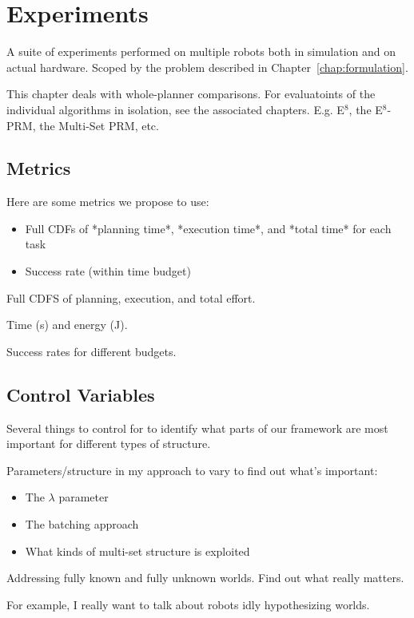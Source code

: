 \chapter{Experiments}
\label{chap:experiments}

A suite of experiments performed on multiple robots
both in simulation and on actual hardware.
Scoped by the problem described in Chapter~\ref{chap:formulation}.

This chapter deals with whole-planner comparisons.
For evaluatoints of the individual algorithms in isolation,
see the associated chapters.
E.g. E$^8$, the E$^8$-PRM, the Multi-Set PRM, etc.

\section{Metrics}

Here are some metrics we propose to use:
\begin{itemize}
\item Full CDFs of *planning time*, *execution time*,
   and *total time* for each task
\item Success rate (within time budget)
\end{itemize}

Full CDFS of planning, execution, and total effort.

Time (s) and energy (J).

Success rates for different budgets.

\section{Control Variables}

Several things to control for to identify what parts of our framework
are most important for different types of structure.

Parameters/structure in my approach to vary to find out
what's important:
\begin{itemize}
\item The $\lambda$ parameter
\item The batching approach
\item What kinds of multi-set structure is exploited
\end{itemize}

Addressing fully known and fully unknown worlds.
Find out what really matters.

For example, I really want to talk about robots idly
hypothesizing worlds.

